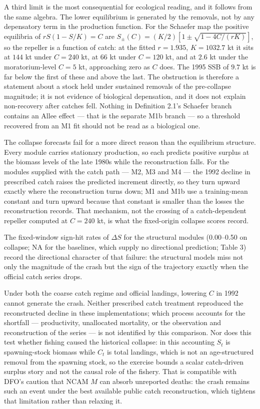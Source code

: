 \documentclass[11pt]{article}
\begin{document}
A third limit is the most consequential for ecological reading, and it
follows from the same algebra. The lower equilibrium is generated by the
removals, not by any depensatory term in the production function. For
the Schaefer map the positive equilibria of \(rS(1-S/K)=C\) are
\(S_{\pm}(C) = (K/2)\left[1 \pm \sqrt{1-4C/(rK)}\right]\), so the
repeller is a function of catch: at the fitted \(r = 1.935\),
\(K = 1032.7\) kt it sits at \(144\) kt under \(C = 240\) kt, at
\(66\) kt under \(C = 120\) kt, and at \(2.6\) kt under the
moratorium-level \(C = 5\) kt, approaching zero as \(C\) does. The
1995 SSB of \(9.7\) kt is far below the first of these and above the
last. The obstruction is therefore a statement about a stock held under
sustained removals of the pre-collapse magnitude; it is not evidence of
biological depensation, and it does not explain non-recovery after
catches fell. Nothing in Definition 2.1's Schaefer branch contains an
Allee effect --- that is the separate M1b branch --- so a threshold
recovered from an M1 fit should not be read as a biological one.

The collapse forecasts fail for a more direct reason than the
equilibrium structure. Every module carries stationary production, so
each predicts positive surplus at the biomass levels of the late 1980s
while the reconstruction falls. For the modules supplied with the catch
path --- M2, M3 and M4 --- the 1992 decline in prescribed catch raises
the predicted increment directly, so they turn upward exactly where the
reconstruction turns down; M1 and M1b use a training-mean constant and
turn upward because that constant is smaller than the losses the
reconstruction records. That mechanism, not the crossing of a
catch-dependent repeller computed at \(C = 240\) kt, is what the
fixed-origin collapse scores record.

The fixed-window sign-hit rates of \(\Delta S\) for the structural
modules (0.00--0.50 on collapse; NA for the baselines, which supply no
directional prediction; Table 3) record the directional character of that failure: the
structural models miss not only the magnitude of the crash but the sign
of the trajectory exactly when the official catch series drops.

Under both the coarse catch regime and official landings, lowering \(C\)
in 1992 cannot generate the crash. Neither prescribed catch treatment reproduced the reconstructed decline
in these implementations; which process accounts for the shortfall ---
productivity, unallocated mortality, or the observation and
reconstruction of the series --- is not identified by this comparison.
Nor does this test whether fishing caused the historical collapse: in
this accounting \(S_t\) is spawning-stock biomass while \(C_t\) is total
landings, which is not an age-structured removal from the spawning
stock, so the exercise bounds a scalar catch-driven surplus story and
not the causal role of the fishery. That is
compatible with DFO's caution that NCAM \(M\) can absorb unreported
deaths: the crash remains such an event under the best available public
catch reconstruction, which tightens that limitation rather than
relaxing it.
\end{document}
